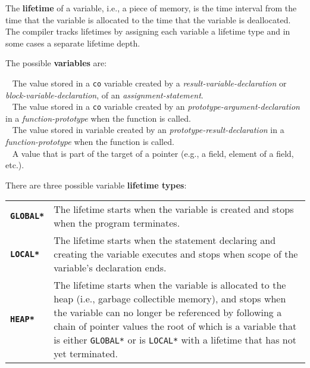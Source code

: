 \documentclass[12pt]{article}
\newcommand{\key}[1]{{\rm \bfseries #1}}
\newcommand{\ttkey}[1]{{\tt \bfseries #1}}
\newcommand{\skey}[2]{{\rm \bfseries #1#2}}
\newenvironment{indpar}[1][0.3in]%
	{\begin{list}{}%
		     {\setlength{\itemsep}{0in}%
		      \setlength{\topsep}{0in}%
		      \setlength{\parsep}{1ex}%
		      \setlength{\labelwidth}{#1}%
		      \setlength{\leftmargin}{#1}%
		      \addtolength{\leftmargin}{\labelsep}}%
	 \item}%
	{\end{list}}
\begin{document}
The \key{lifetime} of a variable, i.e., a piece of memory,
is the time interval from the time that the variable
is allocated to the time that
the variable is deallocated.  The compiler tracks lifetimes by assigning each
variable a lifetime type and in some cases a separate lifetime depth.

The possible \skey{variable}s are:
\begin{indpar}[0.5in]
\hspace*{-0.3in}\key{assignment variable} ~
	The value stored in a {\tt co} variable created by a
	{\em result-variable-declaration} or
	{\em block-variable-declaration},
	of an {\em assignment-state\-ment}.
\\[1ex]
\hspace*{-0.3in}\key{argument variable} ~
	The value stored in a {\tt co} variable created by an
	{\em prototype-argument-declaration} in a {\em function-prototype}
	when the function is called.
\\[1ex]
\hspace*{-0.3in}\key{result variable} ~
	The value stored in variable created by an
	{\em prototype-result-declaration} in a {\em function-prototype}
	when the function is called.
\\[1ex]
\hspace*{-0.3in}\key{target variable} ~
	A value that is part of the target of a pointer
	(e.g., a field, element of a field, etc.).
\end{indpar}

There are three possible variable \skey{lifetime type}s:
\begin{indpar}[0.2in]
\begin{tabular}{lp{5.0in}}
\ttkey{*GLOBAL*}	& The lifetime starts when the variable is created
                          and stops when the program terminates.
\\[1ex]
\ttkey{*LOCAL*}		& The lifetime starts when the statement declaring
                          and creating
                          the variable executes and stops when 
			  scope of the variable's declaration ends.
\\[1ex]
\ttkey{*HEAP*}		& The lifetime starts when the variable is allocated
                          to the heap (i.e., garbage collectible
			  memory), and stops when the variable can no longer
			  be referenced by following a chain of pointer values
			  the root of which is a variable that
			  is either {\tt *GLOBAL*} or is {\tt *LOCAL*}
			  with a lifetime that has not yet terminated.
\end{tabular}
\end{indpar}
\end{document}
